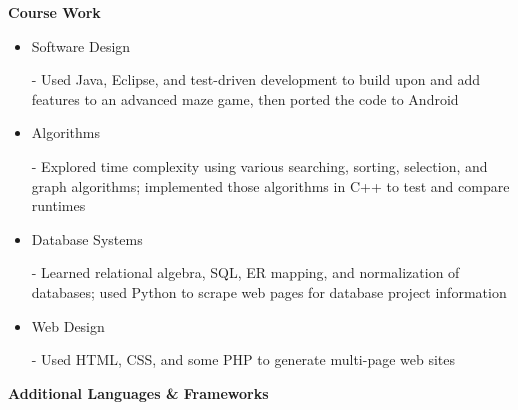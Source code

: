 \documentclass[11pt]{article}
\begin{document}
\begin{LARGE}
	\bf Course Work
\end{LARGE}

\vspace{-0.5em}

\begin{itemize}
	\item \begin{large}\begin{bf}Software Design\end{bf}\end{large} - Used Java, Eclipse, and test-driven development to build upon and add features to an advanced maze game, then ported the code to Android
	\vspace{-0.5em}
	\item \begin{large}\begin{bf}Algorithms\end{bf}\end{large} - Explored time complexity using various searching, sorting, selection, and graph algorithms; implemented those algorithms in C++ to test and compare runtimes
	\vspace{-0.5em}
	\item \begin{large}\begin{bf}Database Systems\end{bf}\end{large} - Learned relational algebra, SQL, ER mapping, and normalization of databases; used Python to scrape web pages for database project information
	\vspace{-0.5em}
	\item \begin{large}\begin{bf}Web Design\end{bf}\end{large} - Used HTML, CSS, and some PHP to generate multi-page web sites
\end{itemize}

\vspace{-0.3em}

\begin{LARGE}
	\bf Additional Languages \& Frameworks
\end{LARGE}

\vspace{-0.5em}
\end{document}
